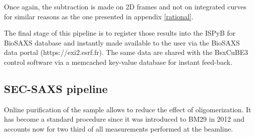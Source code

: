 \documentclass[preprint]{iucr}              %
\begin{document}
Once again, the subtraction is made on 2D frames and not on integrated curves for similar reasons as the one presented in appendix \ref{rational}.



The final stage of this pipeline is to register those results into the ISPyB for BioSAXS \cite{ISPYBB} database and instantly made available to the user via the BioSAXS data portal (https://exi2.esrf.fr). 
The same data are shared with the BsxCuBE3 control software via a memcached key-value database for instant feed-back.

\subsection{SEC-SAXS pipeline}
Online purification of the sample allows to reduce the effect of oligomerization.
It has become a standard procedure since it was introduced to BM29 in 2012 \cite{SECPaper2012} and accounts now for two third of all measurements performed at the beamline.
\end{document}
